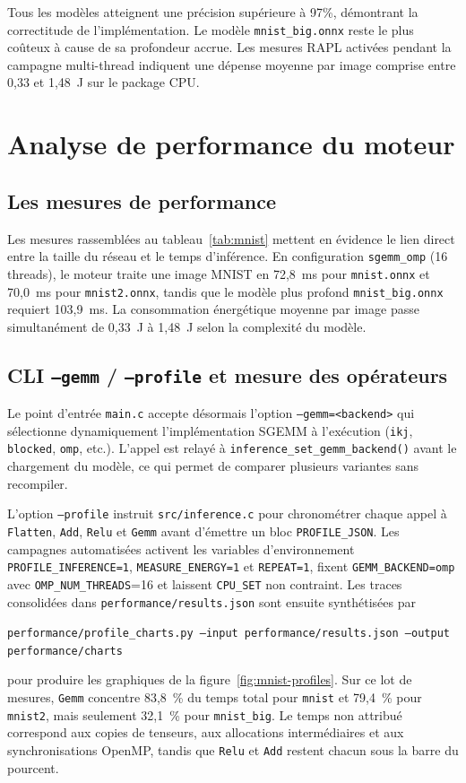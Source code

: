 \documentclass[a4paper,11pt]{article}
\begin{document}
Tous les modèles atteignent une précision supérieure à 97\%, démontrant la correctitude de l'implémentation. Le modèle \texttt{mnist\_big.onnx} reste le plus coûteux à cause de sa profondeur accrue. Les mesures RAPL activées pendant la campagne multi-thread indiquent une dépense moyenne par image comprise entre 0,33 et 1,48~J sur le package CPU.

\vspace{2\baselineskip}

\section{Analyse de performance du moteur}

\subsection{Les mesures de performance}
Les mesures rassemblées au tableau~\ref{tab:mnist} mettent en évidence le lien direct entre la taille du réseau et le temps d'inférence. En configuration \texttt{sgemm\_omp} (16 threads), le moteur traite une image MNIST en 72{,}8~ms pour \texttt{mnist.onnx} et 70{,}0~ms pour \texttt{mnist2.onnx}, tandis que le modèle plus profond \texttt{mnist\_big.onnx} requiert 103{,}9~ms. La consommation énergétique moyenne par image passe simultanément de 0{,}33~J à 1{,}48~J selon la complexité du modèle.

\subsection{CLI \texttt{--gemm} / \texttt{--profile} et mesure des opérateurs}
Le point d'entrée \texttt{main.c} accepte désormais l'option \texttt{--gemm=<backend>} qui sélectionne dynamiquement l'implémentation SGEMM à l'exécution (\texttt{ikj}, \texttt{blocked}, \texttt{omp}, etc.). L'appel est relayé à \texttt{inference\_set\_gemm\_backend()} avant le chargement du modèle, ce qui permet de comparer plusieurs variantes sans recompiler. 

L'option \texttt{--profile} instruit \texttt{src/inference.c} pour chronométrer chaque appel à \texttt{Flatten}, \texttt{Add}, \texttt{Relu} et \texttt{Gemm} avant d'émettre un bloc \texttt{PROFILE\_JSON}. Les campagnes automatisées activent les variables d'environnement \texttt{PROFILE\_INFERENCE=1}, \texttt{MEASURE\_ENERGY=1} et \texttt{REPEAT=1}, fixent \texttt{GEMM\_BACKEND=omp} avec \texttt{OMP\_NUM\_THREADS}=16 et laissent \texttt{CPU\_SET} non contraint. Les traces consolidées dans \texttt{performance/results.json} sont ensuite synthétisées par
\begin{center}
\texttt{performance/profile\_charts.py --input performance/results.json --output performance/charts}
\end{center}
pour produire les graphiques de la figure~\ref{fig:mnist-profiles}. Sur ce lot de mesures, \texttt{Gemm} concentre 83{,}8~\% du temps total pour \texttt{mnist} et 79{,}4~\% pour \texttt{mnist2}, mais seulement 32{,}1~\% pour \texttt{mnist\_big}. Le temps non attribué correspond aux copies de tenseurs, aux allocations intermédiaires et aux synchronisations OpenMP, tandis que \texttt{Relu} et \texttt{Add} restent chacun sous la barre du pourcent.
\end{document}
